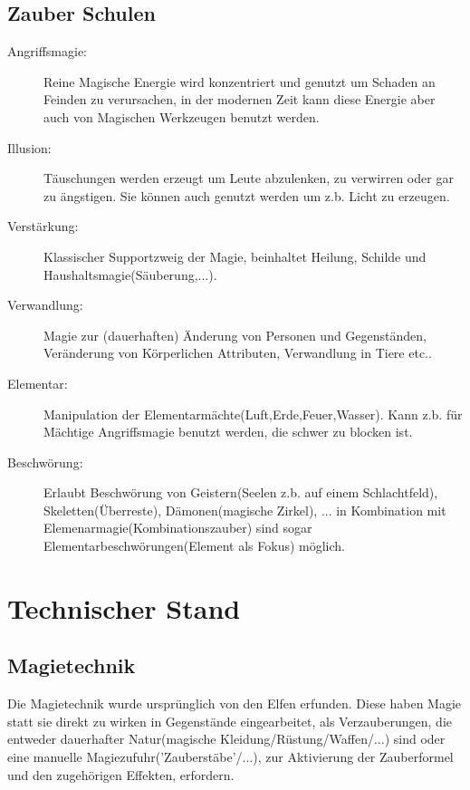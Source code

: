 \section{Zauber Schulen}
\begin{description}

\item[Angriffsmagie:] Reine Magische Energie wird konzentriert und genutzt um Schaden an Feinden zu verursachen, in der modernen Zeit kann diese Energie aber auch von Magischen Werkzeugen benutzt werden.

\item[Illusion:] Täuschungen werden erzeugt um Leute abzulenken, zu verwirren oder gar zu ängstigen. Sie können auch genutzt werden um z.b. Licht zu erzeugen.

\item[Verstärkung:] Klassischer Supportzweig der Magie, beinhaltet Heilung, Schilde und Haushaltsmagie(Säuberung,...).

\item[Verwandlung:] Magie zur (dauerhaften) Änderung von Personen und Gegenständen, Veränderung von Körperlichen Attributen, Verwandlung in Tiere etc..

\item[Elementar:] Manipulation der Elementarmächte(Luft,Erde,Feuer,Wasser). Kann z.b. für Mächtige Angriffsmagie benutzt werden, die schwer zu blocken ist.

\item[Beschwörung:] Erlaubt Beschwörung von Geistern(Seelen z.b. auf einem Schlachtfeld), Skeletten(Überreste), Dämonen(magische Zirkel), ... in Kombination mit Elemenarmagie(Kombinationszauber) sind sogar Elementarbeschwörungen(Element als Fokus) möglich.
\end{description}

\chapter{Technischer Stand}

\section{Magietechnik}

Die Magietechnik wurde ursprünglich von den Elfen erfunden. Diese haben Magie statt sie direkt zu wirken in Gegenstände eingearbeitet, als Verzauberungen, die entweder dauerhafter Natur(magische Kleidung/Rüstung/Waffen/...) sind oder eine manuelle Magiezufuhr('Zauberstäbe'/...), zur Aktivierung der Zauberformel und den zugehörigen Effekten, erfordern.

